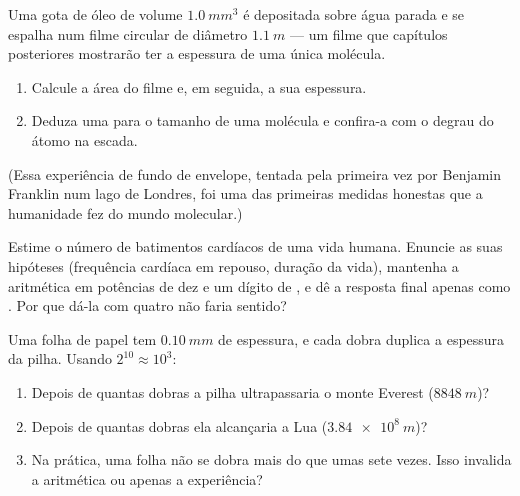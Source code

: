 \begin{exercise}[$\star\star\star$]\label{exo:g10:orders-of-magnitude:12}
Uma gota de óleo de volume $\qty{1.0}{mm^3}$ é depositada sobre água
parada e se espalha num filme circular de diâmetro $\qty{1.1}{m}$ --- um
filme que capítulos posteriores mostrarão ter a espessura de uma única
molécula.
\begin{enumerate}
  \item Calcule a área do filme e, em seguida, a sua espessura.
  \item Deduza uma  para o tamanho de uma molécula e
        confira-a com o degrau do átomo na escada.
\end{enumerate}
(Essa experiência de fundo de envelope, tentada pela primeira vez por
Benjamin Franklin num lago de Londres, foi uma das primeiras medidas
honestas que a humanidade fez do mundo molecular.)
\end{exercise}

\begin{exercise}[$\star\star\star$]\label{exo:g10:orders-of-magnitude:13}
Estime o número de batimentos cardíacos de uma vida humana. Enuncie as
suas hipóteses (frequência cardíaca em repouso, duração da vida),
mantenha a aritmética em potências de dez e um dígito de , e dê
a resposta final apenas como . Por que dá-la com quatro
 não faria sentido?
\end{exercise}

\begin{exercise}[$\star\star\star$]\label{exo:g10:orders-of-magnitude:14}
Uma folha de papel tem $\qty{0.10}{mm}$ de espessura, e cada dobra
duplica a espessura da pilha. Usando $2^{10} \approx 10^{3}$:
\begin{enumerate}
  \item Depois de quantas dobras a pilha ultrapassaria o monte Everest
        ($\qty{8848}{m}$)?
  \item Depois de quantas dobras ela alcançaria a Lua
        ($\qty{3.84e8}{m}$)?
  \item Na prática, uma folha não se dobra mais do que umas sete vezes.
        Isso invalida a aritmética ou apenas a experiência?
\end{enumerate}
\end{exercise}

